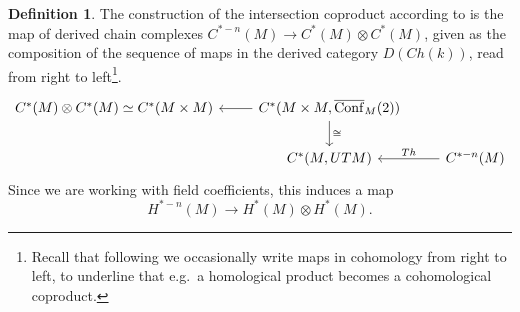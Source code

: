 \documentclass{scrartcl}
\theoremstyle{plain}
\theoremstyle{definition}
\newtheorem{definition}[theorem]{Definition}
\newcommand{\iso}{\cong}
\newcommand{\quiso}{\simeq}
\DeclareMathOperator{\cConf}{\overline{Conf}}
\begin{document}
\begin{definition}
The construction of the intersection coproduct according to \cite{naef2019string} is the map of derived chain complexes $C^{*-n}(M)\to C^*(M)\otimes C^*(M)$, given as the composition of the sequence of maps in the derived category $D(Ch(k))$, read from right to left\footnote{Recall that following \cite{naef2019string} we occasionally write maps in cohomology from right to left, to underline that e.g.\ a homological product becomes a cohomological coproduct. }.
\begin{equation*}
\begin{tikzcd}
    C^*(M)\otimes C^*(M) \quiso C^*(M\times M) & \lar C^*(M\times M, \cConf_M(2)) \dar["\iso"] & \ \\
    & C^*(M, UTM)& \lar[swap, "Th"] C^{*-n}(M)
\end{tikzcd}
\end{equation*}
Since we are working with field coefficients, this induces a map $$H^{*-n}(M)\to H^*(M) \otimes H^*(M).$$
\end{definition}
\end{document}
